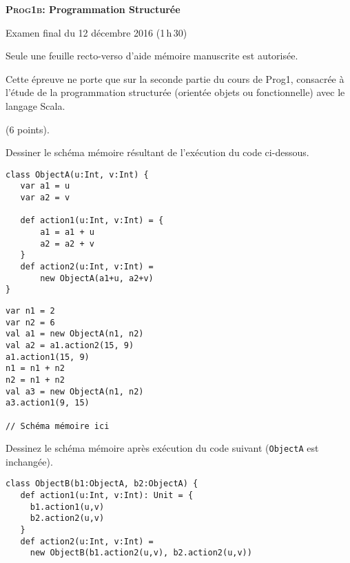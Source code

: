 \documentclass[a4paper,10pt]{article}
\begin{document}
\begin{centering}
  \huge{\bf\textsc{Prog1b:} Programmation Structurée}

  \smallskip
  \Large{Examen final du 12 décembre 2016 (1\,h\,30)}

  \medskip
  Seule une feuille recto-verso d'aide mémoire manuscrite est
  autorisée.
  \bigskip

\end{centering}

Cette épreuve ne porte que sur la seconde partie du cours de Prog1,
consacrée à l'étude de la programmation structurée (orientée objets ou
fonctionnelle) avec le langage Scala.

\bigskip
{} (6 points).

\smallskip

\begin{Question}
Dessiner le schéma mémoire résultant de l'exécution du code ci-dessous.

\begin{multicols}{2}
\begin{minipage}{\linewidth}
\begin{Verbatim}[fontsize=\footnotesize]
class ObjectA(u:Int, v:Int) {
   var a1 = u
   var a2 = v

   def action1(u:Int, v:Int) = {
       a1 = a1 + u
       a2 = a2 + v
   }
   def action2(u:Int, v:Int) = 
       new ObjectA(a1+u, a2+v)
}
\end{Verbatim}
\end{minipage}

\begin{minipage}{\linewidth}
\begin{Verbatim}[fontsize=\footnotesize,firstnumber=last]
var n1 = 2
var n2 = 6
val a1 = new ObjectA(n1, n2)
val a2 = a1.action2(15, 9)
a1.action1(15, 9)
n1 = n1 + n2
n2 = n1 + n2
val a3 = new ObjectA(n1, n2)
a3.action1(9, 15)

// Schéma mémoire ici
\end{Verbatim}
\end{minipage}
\end{multicols}

\Question Dessinez le schéma mémoire après exécution  du code suivant (\verb+ObjectA+ est inchangée).

\begin{multicols}{2}
\begin{minipage}{\linewidth}
\begin{Verbatim}[fontsize=\footnotesize, firstnumber=12]
class ObjectB(b1:ObjectA, b2:ObjectA) {
   def action1(u:Int, v:Int): Unit = {
     b1.action1(u,v)
     b2.action2(u,v)
   }
   def action2(u:Int, v:Int) =
     new ObjectB(b1.action2(u,v), b2.action2(u,v))


\end{Verbatim}
\end{minipage}
\end{multicols}
\end{Question}
\end{document}
